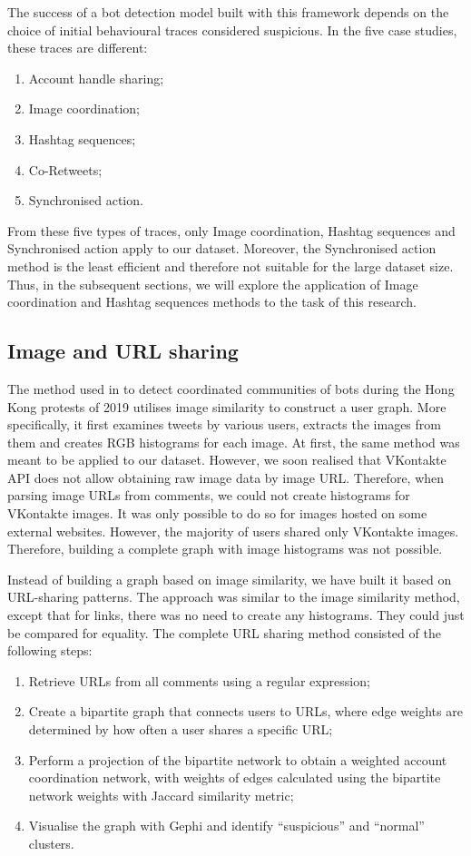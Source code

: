 The success of a bot detection model built with this framework depends on the choice of initial behavioural traces considered suspicious. In the five case studies, these traces are different:
\begin{enumerate}
    \item Account handle sharing;
    \item Image coordination;
    \item Hashtag sequences;
    \item Co-Retweets;
    \item Synchronised action.
\end{enumerate}

From these five types of traces, only Image coordination, Hashtag sequences and Synchronised action apply to our dataset. Moreover, the Synchronised action method is the least efficient and therefore not suitable for the large dataset size. Thus, in the subsequent sections, we will explore the application of Image coordination and Hashtag sequences methods to the task of this research.

\subsection{Image and URL sharing}
\label{sec:image-url-sharing}
The method used in \cite{pacheco2020uncovering} to detect coordinated communities of bots during the Hong Kong protests of 2019 utilises image similarity to construct a user graph. More specifically, it first examines tweets by various users, extracts the images from them and creates RGB histograms for each image. At first, the same method was meant to be applied to our dataset. However, we soon realised that VKontakte API does not allow obtaining raw image data by image URL. Therefore, when parsing image URLs from comments, we could not create histograms for VKontakte images. It was only possible to do so for images hosted on some external websites. However, the majority of users shared only VKontakte images. Therefore, building a complete graph with image histograms was not possible.

Instead of building a graph based on image similarity, we have built it based on URL-sharing patterns. The approach was similar to the image similarity method, except that for links, there was no need to create any histograms. They could just be compared for equality. The complete URL sharing method consisted of the following steps:
\begin{enumerate}
    \item Retrieve URLs from all comments using a regular expression;
    \item Create a bipartite graph that connects users to URLs, where edge weights are determined by how often a user shares a specific URL;
    \item Perform a projection of the bipartite network to obtain a weighted account coordination network, with weights of edges calculated using the bipartite network weights with Jaccard similarity metric;
    \item Visualise the graph with Gephi and identify ``suspicious'' and ``normal'' clusters.
\end{enumerate}


